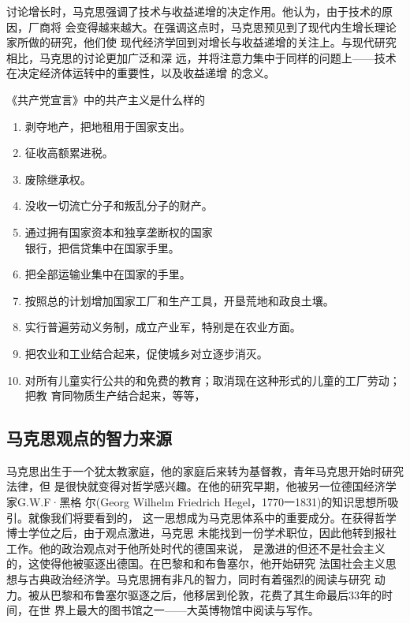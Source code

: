 讨论增长时，马克思强调了技术与收益递增的决定作用。他认为，由于技术的原因，厂商将
会变得越来越大。在强调这点时，马克思预见到了现代内生增长理论家所做的研究，他们使
现代经济学回到对增长与收益递增的关注上。与现代研究相比，马克思的讨论更加广泛和深
远，并将注意力集中于同样的问题上——技术在决定经济体运转中的重要性，以及收益递增
的念义。
\begin{mybox}{《共产党宣言》中的共产主义是什么样的}
  \begin{multicols}{2}
    \begin{enumerate}
    \item 剥夺地产，把地租用于国家支出。
    \item 征收高额累进税。
    \item 废除继承权。
    \item 没收一切流亡分子和叛乱分子的财产。
    \item 通过拥有国家资本和独享垄断权的国家\\银行，把信贷集中在国家手里。
    \item 把全部运输业集中在国家的手里。
    \item 按照总的计划增加国家工厂和生产工具，开垦荒地和政良土壤。
    \item 实行普遍劳动义务制，成立产业军，特别是在农业方面。
    \item 把农业和工业结合起来，促使城乡对立逐步消灭。
    \item 对所有儿童实行公共的和免费的教育；取消现在这种形式的儿童的工厂劳动；把教
      育同物质生产结合起来，等等，
    \end{enumerate}
  \end{multicols}
\end{mybox}


\subsection{马克思观点的智力来源}
马克思出生于一个犹太教家庭，他的家庭后来转为基督教，青年马克思开始时研究法律，但
是很快就变得对哲学感兴趣。在他的研究早期，他被另一位德国经济学家G.W.F·黑格
尔(Georg Wilhelm Friedrich Hegel，1770一1831)的知识思想所吸引。就像我们将要看到的，
这一思想成为马克思体系中的重要成分。在获得哲学博士学位之后，由于观点激进，马克思
未能找到一份学术职位，因此他转到报社工作。他的政治观点对于他所处时代的德国来说，
是激进的但还不是社会主义的，这使得他被驱逐出德国。在巴黎和和布鲁塞尔，他开始研究
法国社会主义思想与古典政治经济学。马克思拥有非凡的智力，同时有着强烈的阅读与研究
动力。被从巴黎和布鲁塞尔驱逐之后，他移居到伦敦，花费了其生命最后33年的时间，在世
界上最大的图书馆之一——大英博物馆中阅读与写作。

